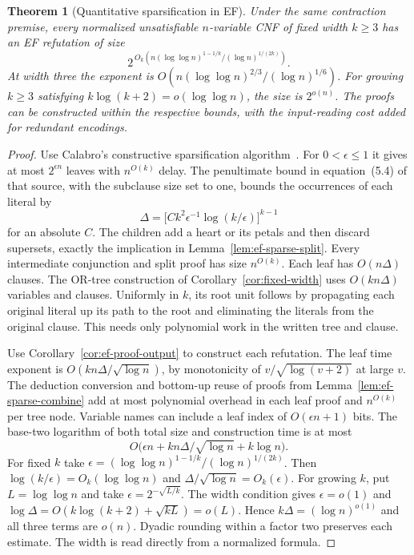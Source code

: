 \documentclass[11pt]{article}
\newtheorem{theorem}{Theorem}[section]
\theoremstyle{definition}
\theoremstyle{remark}
\begin{document}
\begin{theorem}[Quantitative sparsification in EF]\label{thm:quant-width}
Under the same contraction premise, every normalized unsatisfiable
$n$-variable CNF of fixed width $k\ge3$ has an EF refutation of size
\[
 2^{\,O_k\left(n(\log\log n)^{1-1/k}/(\log n)^{1/(2k)}\right)} .
\]
At width three the exponent is
$O(n(\log\log n)^{2/3}/(\log n)^{1/6})$.
For growing $k\ge3$ satisfying $k\log(k+2)=o(\log\log n)$, the size
is $2^{o(n)}$. The proofs can be constructed within the respective
bounds, with the input-reading cost added for redundant encodings.
\end{theorem}
\begin{proof}
Use Calabro's constructive sparsification algorithm~\cite{calabro}.
For $0<\epsilon\le1$ it gives at most $2^{\epsilon n}$ leaves with
$n^{O(k)}$ delay. The penultimate bound in equation~(5.4) of that
source, with the subclause size set to one, bounds the occurrences
of each literal by
\[
 \Delta=\big[C k^2\epsilon^{-1}\log(k/\epsilon)\big]^{k-1}
\]
for an absolute $C$. The children add a heart or its petals and then
discard supersets, exactly the implication in Lemma~\ref{lem:ef-sparse-split}.
Every intermediate conjunction and split proof has size $n^{O(k)}$.
Each leaf has $O(n\Delta)$ clauses. The OR-tree construction of
Corollary~\ref{cor:fixed-width} uses $O(kn\Delta)$ variables and
clauses. Uniformly in $k$, its root unit follows by propagating each
original literal up its path to the root and eliminating the literals
from the original clause. This needs only polynomial work in the
written tree and clause.

Use Corollary~\ref{cor:ef-proof-output} to construct each refutation.
The leaf time exponent is $O(kn\Delta/\sqrt{\log n})$, by monotonicity
of $v/\sqrt{\log(v+2)}$ at large $v$. The deduction conversion and
bottom-up reuse of proofs from Lemma~\ref{lem:ef-sparse-combine} add
at most polynomial overhead in each leaf proof and $n^{O(k)}$ per
tree node. Variable names can include a leaf index of $O(\epsilon n+1)$
bits. The base-two logarithm of both total size and construction time
is at most
\[
 O\big(\epsilon n+kn\Delta/\sqrt{\log n}+k\log n\big).
\]
For fixed $k$ take $\epsilon=(\log\log n)^{1-1/k}/(\log n)^{1/(2k)}$.
Then $\log(k/\epsilon)=O_k(\log\log n)$ and
$\Delta/\sqrt{\log n}=O_k(\epsilon)$. For growing $k$, put
$L=\log\log n$ and take $\epsilon=2^{-\sqrt{L/k}}$. The width
condition gives $\epsilon=o(1)$ and
$\log\Delta=O(k\log(k+2)+\sqrt{kL})=o(L)$. Hence
$k\Delta=(\log n)^{o(1)}$ and all three terms are $o(n)$.
Dyadic rounding within a factor two preserves each estimate. The
width is read directly from a normalized formula.
\end{proof}
\end{document}
